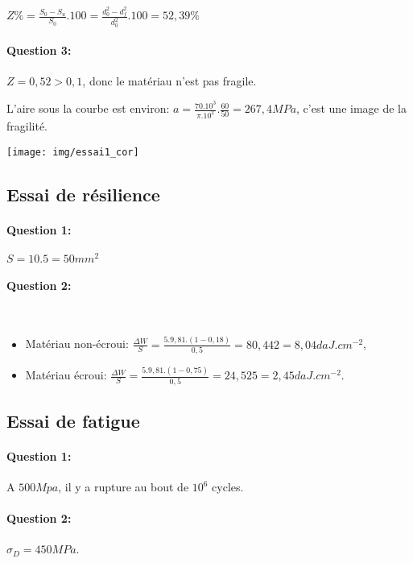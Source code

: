$Z\%=\frac{S_0-S_u}{S_0}.100=\frac{d_0^2-d_f^2}{d_0^2}.100=52,39\%$

\paragraph{Question 3:}

$Z=0,52>0,1$, donc le matériau n'est pas fragile.

L'aire sous la courbe est environ: $a=\frac{70.10^3}{\pi.10^2}.\frac{60}{50}=267,4MPa$, c'est une image de la fragilité.

\begin{center}
 \texttt{[image: img/essai1\_cor]}
\end{center}

\subsection{Essai de résilience}

\paragraph{Question 1:} $S=10.5=50mm^2$

\paragraph{Question 2:} ~\

\begin{itemize}
 \item Matériau non-écroui: $\frac{\Delta W}{S}=\frac{5.9,81.(1-0,18)}{0,5}=80,442=8,04daJ.cm^{-2}$,
 \item Matériau écroui: $\frac{\Delta W}{S}=\frac{5.9,81.(1-0,75)}{0,5}=24,525=2,45daJ.cm^{-2}$.
\end{itemize}

\subsection{Essai de fatigue}

\paragraph{Question 1:} A $500Mpa$, il y a rupture au bout de $10^6$ cycles.

\paragraph{Question 2:} $\sigma_D=450MPa$.



